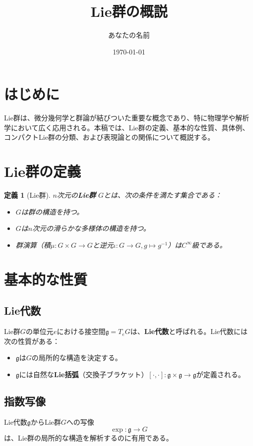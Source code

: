 \documentclass{article}
\title{Lie群の概説}
\author{あなたの名前}
\date{\today}
\newtheorem{definition}{定義} %
\begin{document}
\maketitle

\section*{はじめに}
Lie群は、微分幾何学と群論が結びついた重要な概念であり、特に物理学や解析学において広く応用される。本稿では、Lie群の定義、基本的な性質、具体例、コンパクトLie群の分類、および表現論との関係について概説する。

\section{Lie群の定義}
\begin{definition}[Lie群]
$n$次元の\textbf{Lie群} $G$とは、次の条件を満たす集合である：
\begin{itemize}
    \item $G$は群の構造を持つ。
    \item $G$は$n$次元の滑らかな多様体の構造を持つ。
    \item 群演算（積$\mu: G \times G \to G$と逆元$\iota: G \to G, g \mapsto g^{-1}$）は$C^\infty$級である。
\end{itemize}
\end{definition}

\section{基本的な性質}
\subsection{Lie代数}
Lie群$G$の単位元$e$における接空間$\mathfrak{g} = T_e G$は、\textbf{Lie代数}と呼ばれる。Lie代数には次の性質がある：
\begin{itemize}
    \item $\mathfrak{g}$は$G$の局所的な構造を決定する。
    \item $\mathfrak{g}$には自然な\textbf{Lie括弧}（交換子ブラケット）$[\cdot, \cdot]: \mathfrak{g} \times \mathfrak{g} \to \mathfrak{g}$が定義される。
\end{itemize}

\subsection{指数写像}
Lie代数$\mathfrak{g}$からLie群$G$への写像
\[
\exp: \mathfrak{g} \to G
\]
は、Lie群の局所的な構造を解析するのに有用である。
\end{document}
